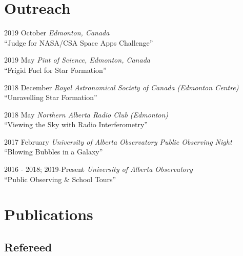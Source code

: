 \documentclass[letterpaper,11pt]{article}
\newlength{\mainindent} \setlength{\mainindent}{12pt}
\newlength{\contentindent} \setlength{\contentindent}{19ex}
\newenvironment{datelist}{
  \begingroup
  \raggedright
  \begin{description}[labelindent=\mainindent,leftmargin=\contentindent,
      style=sameline,font=\normalfont,topsep=0pt,partopsep=0pt,parsep=0pt,
      itemsep=4pt]
}{
  \end{description}
  \endgroup
}
\begin{document}



\section*{Outreach}
\begin{datelist}
\item[2019 October] \emph{Edmonton, Canada} \\ ``Judge for NASA/CSA Space Apps Challenge''
\item[2019 May] \emph{Pint of Science, Edmonton, Canada} \\ ``Frigid Fuel for Star Formation''
\item[2018 December] \emph{Royal Astronomical Society of Canada (Edmonton Centre)} \\ ``Unravelling Star Formation''
\item[2018 May] \emph{Northern Alberta Radio Club (Edmonton)} \\ ``Viewing the Sky with Radio Interferometry''
\item[2017 February] \emph{University of Alberta Observatory Public Observing Night} \\ ``Blowing Bubbles in a Galaxy''
\item[2016 - 2018; 2019-Present] \emph{University of Alberta Observatory} \\ ``Public Observing \& School Tours''
\end{datelist}




\section*{Publications}

\subsection*{Refereed}
\end{document}
